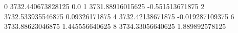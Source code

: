 0 3732.440673828125 0.0
1 3731.88916015625 -0.551513671875
2 3732.533935546875 0.09326171875
4 3732.42138671875 -0.019287109375
6 3733.88623046875 1.445556640625
8 3734.33056640625 1.889892578125
